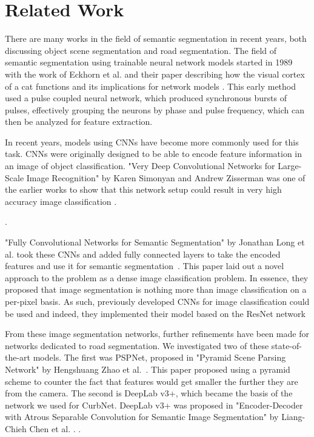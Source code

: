 \chapter{Related Work}\label{chap:relatedwork}
There are many works in the field of semantic segmentation in recent years, both discussing object scene segmentation and road segmentation.
The field of semantic segmentation using trainable neural network models started in 1989 with the work of Eckhorn et al. and their paper describing how the visual cortex of a cat functions and its implications for network models \cite{eckhorncat}.
This early method used a pulse coupled neural network, which produced synchronous bursts of pulses, effectively grouping the neurons by phase and pulse frequency, which can then be analyzed for feature extraction.

In recent years, models using CNNs have become more commonly used for this task.
CNNs were originally designed to be able to encode feature information in an image of object classification.
"Very Deep Convolutional Networks for Large-Scale Image Recognition" by Karen Simonyan and Andrew Zisserman was one of the earlier works to show that this network setup could result in very high accuracy image classification \cite{vgg}.

\cite{resnet}.

"Fully Convolutional Networks for Semantic Segmentation" by Jonathan Long et al. took these CNNs and added fully connected layers to take the encoded features and use it for semantic segmentation~\cite{fcn}.
This paper laid out a novel approach to the problem as a dense image classification problem.
In essence, they proposed that image segmentation is nothing more than image classification on a per-pixel basis.
As such, previously developed CNNs for image classification could be used and indeed, they implemented their model based on the ResNet network

From these image segmentation networks, further refinements have been made for networks dedicated to road segmentation.
We investigated two of these state-of-the-art models.
The first was PSPNet, proposed in "Pyramid Scene Parsing Network" by Hengshuang Zhao et al.~\cite{pspnet}.
This paper proposed using a pyramid scheme to counter the fact that features would get smaller the further they are from the camera. 
The second is DeepLab v3+, which became the basis of the network we used for CurbNet. DeepLab v3+ was proposed in "Encoder-Decoder with Atrous Separable Convolution for Semantic Image Segmentation" by Liang-Chieh Chen et al. \cite{deeplab}. .


